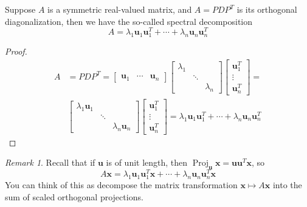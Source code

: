 \documentclass{beamer}
\DeclareMathOperator{\Proj}{Proj}
\theoremstyle{definition}
\theoremstyle{remark}
\newtheorem*{remark}{Remark}
\begin{document}
\begin{frame}[t]
\begin{theorem}
Suppose $A$ is a symmetric real-valued matrix, and $A=PDP^T$ is its orthogonal diagonalization\pause, then we have the so-called spectral decomposition
\[
A=\lambda_1\mathbf u_1\mathbf u_1^T+\cdots+\lambda_n\mathbf u_n\mathbf u_n^T
\]
\end{theorem}
\pause
\begin{proof}
\begin{align*}
A&=PDP^T=\begin{bmatrix}
\mathbf u_1&\cdots&\mathbf u_n
\end{bmatrix}\begin{bmatrix}
\lambda_1&&\\
&\ddots&\\
&&\lambda_n
\end{bmatrix}\begin{bmatrix}
\mathbf u_1^T\\\vdots\\\mathbf u_n^T
\end{bmatrix}=\\
&\begin{bmatrix}
\lambda_1\mathbf u_1&&\\
&\ddots&\\
&&\lambda_n\mathbf u_n
\end{bmatrix}\begin{bmatrix}
\mathbf u_1^T\\\vdots\\\mathbf u_n^T
\end{bmatrix}=\lambda_1\mathbf u_1\mathbf u_1^T+\cdots+\lambda_n\mathbf u_n\mathbf u_n^T
\end{align*}
\end{proof}
\end{frame}

\begin{frame}[t]
\begin{remark}
Recall that if $\mathbf u$ is of unit length, then $\Proj_{\mathbf u}\mathbf x=\mathbf u\mathbf u^T\mathbf x$\pause, so
\[
A\mathbf x=\lambda_1\mathbf u_1\mathbf u_1^T\mathbf x+\cdots+\lambda_n\mathbf u_n\mathbf u_n^T\mathbf x
\]\pause
You can think of this as decompose the matrix transformation $\mathbf x\mapsto A\mathbf x$ into the sum of scaled orthogonal projections.
\end{remark}
\end{frame}

\end{document}
